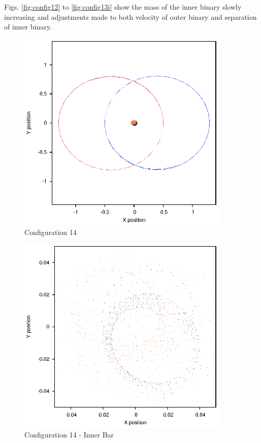 \documentclass[a4paper,12pt]{article}
\begin{document}
Figs. \ref{fig:config12} to \ref{fig:config13i} show the mass of the inner binary slowly increasing and adjustments made to both velocity of outer binary
and separation of inner binary.

\begin{figure}[H]
\centering
\includegraphics[width=0.9\textwidth]{./2017results/035-75-04-4/Orbit.eps}
\caption{Configuration 14}
\label{fig:config14}
\end{figure}
\begin{figure}[H]
\centering
\includegraphics[width=0.9\textwidth]{./2017results/035-75-04-4/Inner.eps}
\caption{Configuration 14 - Inner Bar}
\label{fig:config14i}
\end{figure}
\end{document}
